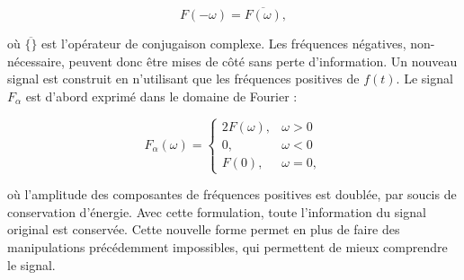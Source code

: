 \begin{equation}
    F(-\omega) = \overline{F(\omega)},
\end{equation}

\noindent où $\overline{\{\}}$ est l'opérateur de conjugaison complexe. Les fréquences négatives, non-nécessaire, peuvent donc être mises de côté sans perte d'information. Un nouveau signal est construit en n'utilisant que les fréquences positives de $f(t)$. Le signal $F_{\alpha}$ est d'abord exprimé dans le domaine de Fourier :

\begin{equation}
    F_{\alpha}(\omega) = \left\{
    \begin{array}{ll}
        2F(\omega), & \omega > 0 \\
        0, & \omega < 0 \\
        F(0), & \omega = 0,
    \end{array}
    \right.
\end{equation}

\noindent où l'amplitude des composantes de fréquences positives est doublée, par soucis de conservation d'énergie. Avec cette formulation, toute l'information du signal original est conservée. Cette nouvelle forme permet en plus de faire des manipulations précédemment impossibles, qui permettent de mieux comprendre le signal.

\bigskip


